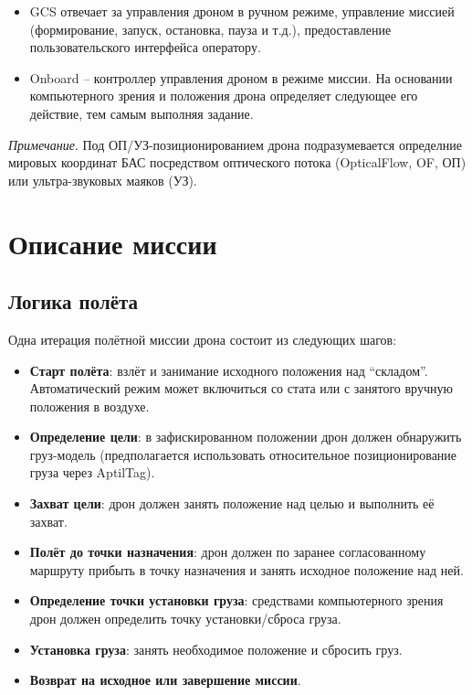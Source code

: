 \documentclass[a4paper, 14pt]{extarticle}
\begin{document}
\begin{itemize}
  \item GCS отвечает за управления дроном в ручном режиме, управление миссией (формирование, запуск, остановка, пауза и т.д.), предоставление пользовательского интерфейса оператору. 
  \item Onboard -- контроллер управления дроном в режиме миссии. На основании компьютерного зрения и положения дрона определяет следующее его действие, тем самым выполняя задание.
\end{itemize}

\textit{Примечание}. Под ОП/УЗ-позиционированием дрона подразумевается определние мировых координат БАС посредством оптического потока (OpticalFlow, OF, ОП) или ультра-звуковых маяков (УЗ).

\section{Описание миссии}

\subsection{Логика полёта}
Одна итерация полётной миссии дрона состоит из следующих шагов:
\begin{itemize}
  \item \textbf{Старт полёта}: взлёт и занимание исходного положения над ``складом''. Автоматический режим может включиться со стата или с занятого вручную положения в воздухе.
  \item \textbf{Определение цели}: в зафискированном положении дрон должен обнаружить груз-модель (предполагается использовать относительное позиционирование груза через AptilTag).
  \item \textbf{Захват цели}: дрон должен занять положение над целью и выполнить её захват.
  \item \textbf{Полёт до точки назначения}: дрон должен по заранее согласованному маршруту прибыть в точку назначения и занять исходное положение над ней.
  \item \textbf{Определение точки установки груза}: средствами компьютерного зрения дрон должен определить точку установки/сброса груза.
  \item \textbf{Установка груза}: занять необходимое положение и сбросить груз.
  \item \textbf{Возврат на исходное или завершение миссии}.
\end{itemize}
\end{document}
